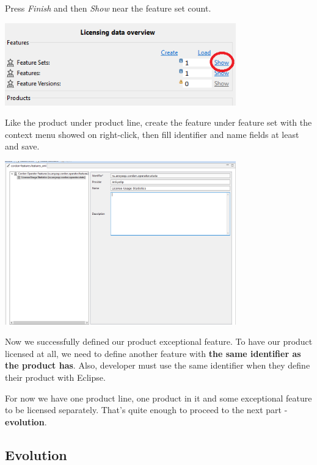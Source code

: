 \documentclass[12pt]{report}
\begin{document}
Press \textit{Finish} and then \textit{Show} near the feature set count.

\begin{center}
    \includegraphics[width=0.75\textwidth]{feature_create}
\end{center}

Like the product under product line, create the feature under feature set with the context menu showed on right-click, then fill identifier and name fields at least and save.

\begin{center}
    \includegraphics[width=0.75\textwidth]{feature_dialog}
\end{center}

Now we successfully defined our product exceptional feature. To have our product licensed at all, we need to define another feature with \textbf{the same identifier as the product has}.
Also, developer must use the same identifier when they define their product with Eclipse.

For now we have one product line, one product in it and some exceptional feature to be licensed separately. That's quite enough to proceed to the next part - \textbf{evolution}.

\subsection*{Evolution}
\end{document}
